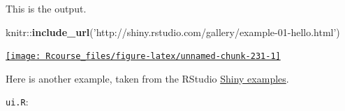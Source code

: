 \documentclass[]{book}
\newenvironment{Shaded}{\begin{snugshade}}{\end{snugshade}}
\newcommand{\KeywordTok}[1]{\textcolor[rgb]{0.13,0.29,0.53}{\textbf{{#1}}}}
\newcommand{\StringTok}[1]{\textcolor[rgb]{0.31,0.60,0.02}{{#1}}}
\newcommand{\NormalTok}[1]{{#1}}
\theoremstyle{definition}
\theoremstyle{definition}
\theoremstyle{remark}
\begin{document}
This is the output.

\begin{Shaded}
\begin{Highlighting}[]
\NormalTok{knitr::}\KeywordTok{include_url}\NormalTok{(}\StringTok{'http://shiny.rstudio.com/gallery/example-01-hello.html'}\NormalTok{)}
\end{Highlighting}
\end{Shaded}

\href{http://shiny.rstudio.com/gallery/example-01-hello.html}{\texttt{[image: Rcourse\_files/figure-latex/unnamed-chunk-231-1]} }

Here is another example, taken from the RStudio
\href{https://github.com/rstudio/shiny-examples/tree/master/006-tabsets}{Shiny
examples}.

\texttt{ui.R}:
\end{document}
